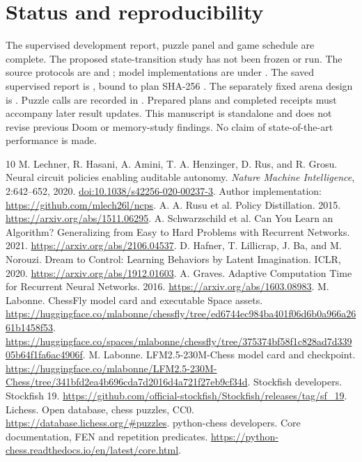\documentclass[10pt]{article}
\begin{document}
\section{Status and reproducibility}
The supervised development report, puzzle panel and game schedule are complete.
The proposed state-transition study has not been frozen or run. The source protocols are
 and ; model
implementations are under .
The saved supervised report is ,
bound to plan SHA-256
.
The separately fixed arena design is .
Puzzle calls are recorded in .
Prepared plans and completed receipts must accompany later result updates.
This manuscript is standalone and does not revise previous Doom or memory-study
findings. No claim of state-of-the-art performance is made.

\begin{thebibliography}{10}
M. Lechner, R. Hasani, A. Amini, T. A. Henzinger, D. Rus, and R. Grosu.
Neural circuit policies enabling auditable autonomy.
\emph{Nature Machine Intelligence}, 2:642--652, 2020.
\href{https://doi.org/10.1038/s42256-020-00237-3}{doi:10.1038/s42256-020-00237-3}.
Author implementation: \url{https://github.com/mlech26l/ncps}.
A. A. Rusu et al. Policy Distillation. 2015.
\url{https://arxiv.org/abs/1511.06295}.
A. Schwarzschild et al. Can You Learn an Algorithm? Generalizing from Easy to
Hard Problems with Recurrent Networks. 2021.
\url{https://arxiv.org/abs/2106.04537}.
D. Hafner, T. Lillicrap, J. Ba, and M. Norouzi.
Dream to Control: Learning Behaviors by Latent Imagination. ICLR, 2020.
\url{https://arxiv.org/abs/1912.01603}.
A. Graves. Adaptive Computation Time for Recurrent Neural Networks. 2016.
\url{https://arxiv.org/abs/1603.08983}.
M. Labonne. ChessFly model card and executable Space assets.
\url{https://huggingface.co/mlabonne/chessfly/tree/ed6744ec984ba401f06d6b0a966a2661b1458f53}.
\url{https://huggingface.co/spaces/mlabonne/chessfly/tree/375374bf58f1c828ad7d33905b64f1fa6ac4906f}.
M. Labonne. LFM2.5-230M-Chess model card and checkpoint.
\url{https://huggingface.co/mlabonne/LFM2.5-230M-Chess/tree/341bfd2ea4b696cda7d2016d4a721f27eb9cf34d}.
Stockfish developers. Stockfish 19.
\url{https://github.com/official-stockfish/Stockfish/releases/tag/sf_19}.
Lichess. Open database, chess puzzles, CC0.
\url{https://database.lichess.org/#puzzles}.
python-chess developers. Core documentation, FEN and repetition predicates.
\url{https://python-chess.readthedocs.io/en/latest/core.html}.
\end{thebibliography}
\end{document}
